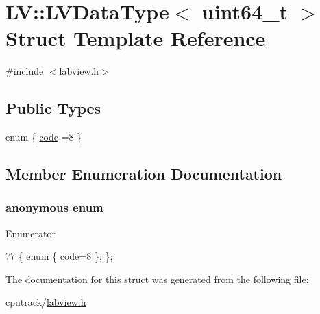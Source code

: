 \hypertarget{struct_l_v_1_1_l_v_data_type_3_01uint64__t_01_4}{}\section{LV\+:\+:L\+V\+Data\+Type$<$ uint64\+\_\+t $>$ Struct Template Reference}
\label{struct_l_v_1_1_l_v_data_type_3_01uint64__t_01_4}


{\ttfamily \#include $<$labview.\+h$>$}

\subsection*{Public Types}
\begin{DoxyCompactItemize}
\item 
enum \{ \hyperlink{struct_l_v_1_1_l_v_data_type_3_01uint64__t_01_4_a98c52b5824c4e40375b4bc5b071514c1a5a100d11c26f1788f0d7c84dca4ebb48}{code} =8
 \}
\end{DoxyCompactItemize}


\subsection{Member Enumeration Documentation}
\subsubsection[{\texorpdfstring{anonymous enum}{anonymous enum}}]{\setlength{\rightskip}{0pt plus 5cm}anonymous enum}\hypertarget{struct_l_v_1_1_l_v_data_type_3_01uint64__t_01_4_a98c52b5824c4e40375b4bc5b071514c1}{}\label{struct_l_v_1_1_l_v_data_type_3_01uint64__t_01_4_a98c52b5824c4e40375b4bc5b071514c1}
\begin{Desc}
\item[Enumerator]\par
\begin{description}
\item[{\em 
code\hypertarget{struct_l_v_1_1_l_v_data_type_3_01uint64__t_01_4_a98c52b5824c4e40375b4bc5b071514c1a5a100d11c26f1788f0d7c84dca4ebb48}{}\label{struct_l_v_1_1_l_v_data_type_3_01uint64__t_01_4_a98c52b5824c4e40375b4bc5b071514c1a5a100d11c26f1788f0d7c84dca4ebb48}
}]\end{description}
\end{Desc}

\begin{DoxyCode}
77 \{ \textcolor{keyword}{enum} \{ \hyperlink{struct_l_v_1_1_l_v_data_type_3_01uint64__t_01_4_a98c52b5824c4e40375b4bc5b071514c1a5a100d11c26f1788f0d7c84dca4ebb48}{code}=8 \}; \};
\end{DoxyCode}


The documentation for this struct was generated from the following file\+:\begin{DoxyCompactItemize}
\item 
cputrack/\hyperlink{labview_8h}{labview.\+h}\end{DoxyCompactItemize}
